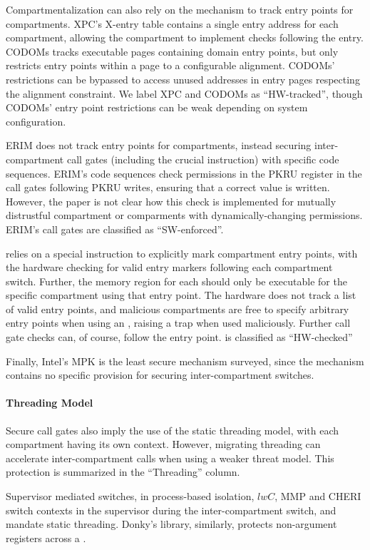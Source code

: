 Compartmentalization can also rely on the mechanism to track entry points for
compartments.
XPC's X-entry table contains a single entry address for each compartment,
allowing the compartment to implement checks following the entry.
CODOMs tracks executable pages containing domain entry points, but only
restricts entry points within a page to a configurable alignment.
CODOMs' restrictions can be bypassed to access unused addresses in
entry pages respecting the alignment constraint.
We label XPC and CODOMs as ``HW-tracked'', though CODOMs' entry point
restrictions can be weak depending on system configuration.

ERIM does not track entry points for compartments, instead securing 
inter-compartment call gates (including the crucial  instruction)
with specific code sequences.
ERIM's code sequences check permissions in the PKRU register in the call
gates following PKRU writes, ensuring that a correct value is written.
However, the paper is not clear how this check is implemented for mutually
distrustful compartment or comparments with dynamically-changing permissions.
ERIM's call gates are classified as ``SW-enforced''.

\seccells relies on a special instruction  to explicitly
mark compartment entry points, with the hardware checking for valid
entry markers following each compartment switch.
Further, the memory region for each  should only be executable
for the specific compartment using that entry point.
The hardware does not track a list of valid entry points, and
malicious compartments are free to specify arbitrary entry points when
using an , raising a trap when used maliciously.
Further call gate checks can, of course, follow the entry point.
\seccells is classified as ``HW-checked''

Finally, Intel's MPK is the least secure mechanism surveyed, since the
mechanism contains no specific provision for securing inter-compartment
switches.

\paragraph{Threading Model}
Secure call gates also imply the use of the static threading model, with each
compartment having its own context.
However, migrating threading can accelerate inter-compartment calls when using
a weaker threat model.
This protection is summarized in the ``Threading'' column.

Supervisor mediated switches, in process-based isolation, $lwC$, MMP
and CHERI switch contexts in the supervisor during the inter-compartment
switch, and mandate static threading.
Donky's library, similarly, protects non-argument registers across
a .

